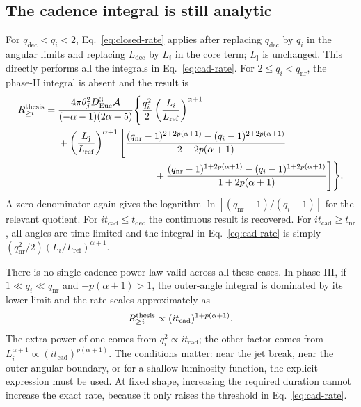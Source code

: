 \documentclass[11pt,a4paper]{article}
\newcommand{\Euc}{\mathrm{Euc}}
\newcommand{\dec}{\mathrm{dec}}
\newcommand{\nr}{\mathrm{nr}}
\newcommand{\Lref}{L_{\mathrm{ref}}}
\newcommand{\Ldec}{L_{\mathrm{dec}}}
\newcommand{\Lj}{L_{\mathrm j}}
\newcommand{\tcad}{t_{\mathrm{cad}}}
\newcommand{\tdec}{t_{\mathrm{dec}}}
\newcommand{\tnr}{t_{\mathrm{nr}}}
\begin{document}
\subsection{The cadence integral is still analytic}
For $q_\dec<q_i<2$, Eq.~\eqref{eq:closed-rate} applies after replacing
$q_\dec$ by $q_i$ in the angular limits and replacing $\Ldec$ by $L_i$
in the core term; $\Lj$ is unchanged. This directly performs all the
integrals in Eq.~\eqref{eq:cad-rate}.
For $2\le q_i<q_\nr$, the phase-II integral is absent and the result is
\begin{equation}
\begin{aligned}
 R_{\ge i}^{\rm thesis}={}&
 \frac{4\pi\theta_j^2D_\Euc^3\mathcal A}
 {(-\alpha-1)(2\alpha+5)}\Bigg\{
 \frac{q_i^2}{2}\left(\frac{L_i}{\Lref}\right)^{\alpha+1}\\
 &+\left(\frac{\Lj}{\Lref}\right)^{\alpha+1}\Bigg[
 \frac{(q_\nr-1)^{2+2p(\alpha+1)}-(q_i-1)^{2+2p(\alpha+1)}}
 {2+2p(\alpha+1)}\\
 &\hspace{3.5cm}+
 \frac{(q_\nr-1)^{1+2p(\alpha+1)}-(q_i-1)^{1+2p(\alpha+1)}}
 {1+2p(\alpha+1)}\Bigg]\Bigg\}.
\end{aligned}
\label{eq:cad-closed}
\end{equation}
A zero denominator again gives the logarithm
$\ln[(q_\nr-1)/(q_i-1)]$ for the relevant quotient.
For $i\tcad\le\tdec$ the continuous result is recovered.
For $i\tcad\ge\tnr$, all angles are time limited and the integral in
Eq.~\eqref{eq:cad-rate} is simply
$(q_\nr^2/2)(L_i/\Lref)^{\alpha+1}$.

There is no single cadence power law valid across all these cases.
In phase III, if $1\ll q_i\ll q_\nr$ and
$-p(\alpha+1)>1$, the outer-angle integral is dominated by its lower
limit and the rate scales approximately as
\begin{equation}
 R_{\ge i}^{\rm thesis}\propto(i\tcad)^{1+p(\alpha+1)}.
 \label{eq:cad-asymptote}
\end{equation}
The extra power of one comes from $q_i^2\propto i\tcad$;
the other factor comes from $L_i^{\alpha+1}\propto(i\tcad)^{p(\alpha+1)}$.
The conditions matter: near the jet break, near the outer angular boundary,
or for a shallow luminosity function, the explicit expression must be used.
At fixed shape, increasing the required duration cannot increase the exact
rate, because it only raises the threshold in Eq.~\eqref{eq:cad-rate}.
\end{document}
